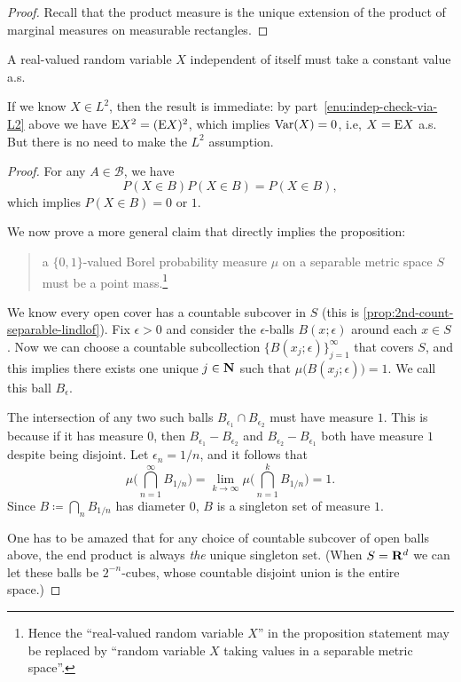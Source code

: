 \begin{proof}
    Recall that the product measure is the unique extension of the product of marginal measures on measurable rectangles.
\end{proof}

\begin{prop}
    A real-valued random variable $X$ independent of itself must take a constant value a.s.
\end{prop}

If we know $X \in L^2$, then the result is immediate: by part~\ref{enu:indep-check-via-L2} above we have $\mathop{}\!\mathrm{E} X^2 = (\mathop{}\!\mathrm{E} X)^2$, which implies $\operatorname{Var}(X) = 0$, i.e, $X = \mathop{}\!\mathrm{E} X$ a.s. But there is no need to make the $L^2$ assumption.

\begin{proof}
    For any $A\in \mathcal B$, we have \[
    	P(X\in B)P(X\in B) = P(X \in B),
    \] which implies $P(X \in B) = 0$ or $1$.
	
    We now prove a more general claim that directly implies the proposition: 
    \begin{quote}
        a $\{0,1\}$-valued Borel probability measure $\mu$ on a separable metric space $S$ must be a point mass.\footnote{Hence the ``real-valued random variable $X$'' in the proposition statement may be replaced by ``random variable $X$ taking values in a separable metric space''.}
    \end{quote}
    We know every open cover has a countable subcover in $S$ (this is \cref{prop:2nd-count-separable-lindlof}). Fix $\epsilon >0$ and consider the $\epsilon$-balls $B(x;\epsilon)$ around each $x\in S$. Now we can choose a countable subcollection $\{B(x_j;\epsilon)\}_{j=1}^\infty$ that covers $S$, and this implies there exists one unique $j\in \mathbf{N}$ such that $\mu\bigl(B(x_j;\epsilon)\bigr) = 1$. We call this ball $B_\epsilon$.

    The intersection of any two such balls $B_{\epsilon_1}\cap B_{\epsilon_2}$ must have measure $1$. This is because if it has measure $0$, then $B_{\epsilon_1} - B_{\epsilon_2}$ and $B_{\epsilon_2} - B_{\epsilon_1}$ both have measure $1$ despite being disjoint. Let $\epsilon_n = 1/n$, and it follows that \[
        \mu\biggl(\bigcap_{n=1}^\infty B_{1/n}\biggr) = \lim_{k\to \infty} \mu\biggl(\bigcap_{n=1}^k B_{1/n}\biggr) = 1.
    \] Since $B\coloneqq \bigcap_{n} B_{1/n}$ has diameter $0$, $B$ is a singleton set of measure $1$.

    One has to be amazed that for any choice of countable subcover of open balls above, the end product is always \emph{the} unique singleton set. (When $S = \mathbf{R}^d$ we can let these balls be $2^{-n}$-cubes, whose countable disjoint union is the entire space.)
\end{proof}

